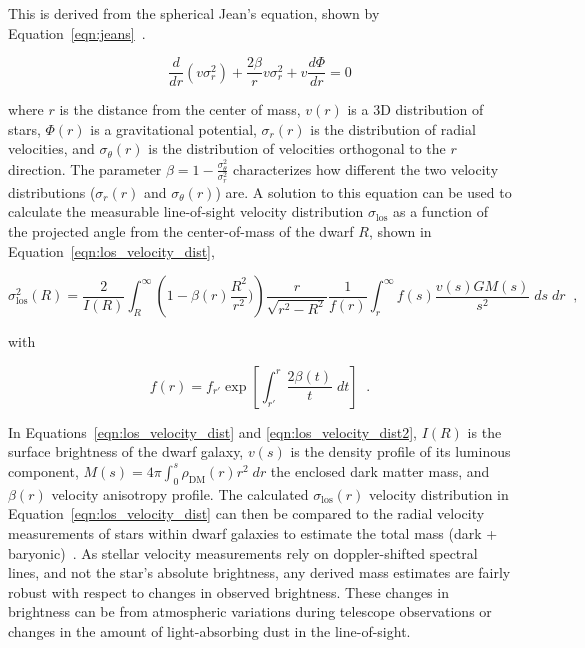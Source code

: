 This is derived from the spherical Jean's equation, shown by Equation~\ref{eqn:jeans}~\cite{galactic_dynamics}.

\begin{equation}\label{eqn:jeans}
  \frac{d}{dr} \left ( v \sigma_r^2\right) + \frac{2 \beta}{r}v \sigma_r^2 + v \frac{d \Phi}{dr}=0
\end{equation}

where $r$ is the distance from the center of mass, $v(r)$ is a 3D distribution of stars, $\Phi(r)$ is a gravitational potential, $\sigma_r(r)$ is the distribution of radial velocities, and $\sigma_\theta(r)$ is the distribution of velocities orthogonal to the $r$ direction.
The parameter $\beta = 1 - \frac{\sigma_{\theta}^2}{\sigma_r^2}$ characterizes how different the two velocity distributions ($\sigma_r(r)$ and $\sigma_{\theta}(r)$) are.
A solution to this equation can be used to calculate the measurable line-of-sight velocity distribution $\sigma_{\mathrm{los}}$ as a function of the projected angle from the center-of-mass of the dwarf $R$, shown in Equation~\ref{eqn:los_velocity_dist},

\begin{equation}\label{eqn:los_velocity_dist}
  \sigma_{\mathrm{los}}^2 \left ( R \right ) = \frac{2}{I(R)} \int_R^{\infty} \left ( 1 - \beta(r) \frac{R^2}{r^2}) \right ) \frac{r}{\sqrt{r^2-R^2}} \frac{1}{f(r)} \int_r^\infty f(s) \frac{v(s)GM(s)}{s^2} \; ds\; dr \;\; ,
\end{equation}

with

\begin{equation}\label{eqn:los_velocity_dist2}
  f(r) = f_{r'} \exp \left [ \int_{r'}^r \frac{2 \beta(t) }{t} \; dt \right ] \;\; .
\end{equation}

In Equations~\ref{eqn:los_velocity_dist} and \ref{eqn:los_velocity_dist2}, $I(R)$ is the surface brightness of the dwarf galaxy, $v(s)$ is the density profile of its luminous component, $M(s)=4\pi \int_0^s \rho_{\textrm{DM}}(r) r^2 \; dr$ the enclosed dark matter mass, and $\beta(r)$ velocity anisotropy profile.
The calculated $\sigma_{\mathrm{los}}(r)$ velocity distribution in Equation~\ref{eqn:los_velocity_dist} can then be compared to the radial velocity measurements of stars within dwarf galaxies to estimate the total mass (dark + baryonic)~\cite{dwarf_gal_vel_dispersion,dwarf_gal_vel_dispersion_a,dwarf_jfactors_no_priors}.
As stellar velocity measurements rely on doppler-shifted spectral lines, and not the star's absolute brightness, any derived mass estimates are fairly robust with respect to changes in observed brightness.
These changes in brightness can be from atmospheric variations during telescope observations or changes in the amount of light-absorbing dust in the line-of-sight.

